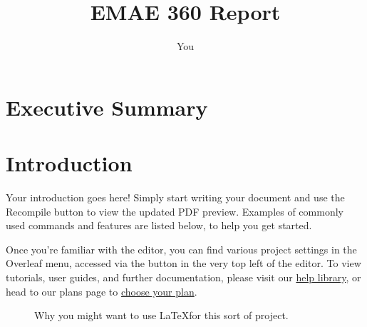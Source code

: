 \documentclass{article}
\title{EMAE 360 Report}
\author{You}
\begin{document}
\maketitle
\newpage

\tableofcontents
\newpage

\section*{Executive Summary}
\newpage

\section{Introduction}

Your introduction goes here! Simply start writing your document and use the Recompile button to view the updated PDF preview. Examples of commonly used commands and features are listed below, to help you get started.

Once you're familiar with the editor, you can find various project settings in the Overleaf menu, accessed via the button in the very top left of the editor. To view tutorials, user guides, and further documentation, please visit our \href{https://www.overleaf.com/learn}{help library}, or head to our plans page to \href{https://www.overleaf.com/user/subscription/plans}{choose your plan}.

\begin{figure}
    \centering
{}


    \caption{Why you might want to use \LaTeX for this sort of project.}
    \label{fig:whylatex}
\end{figure}
\end{document}
